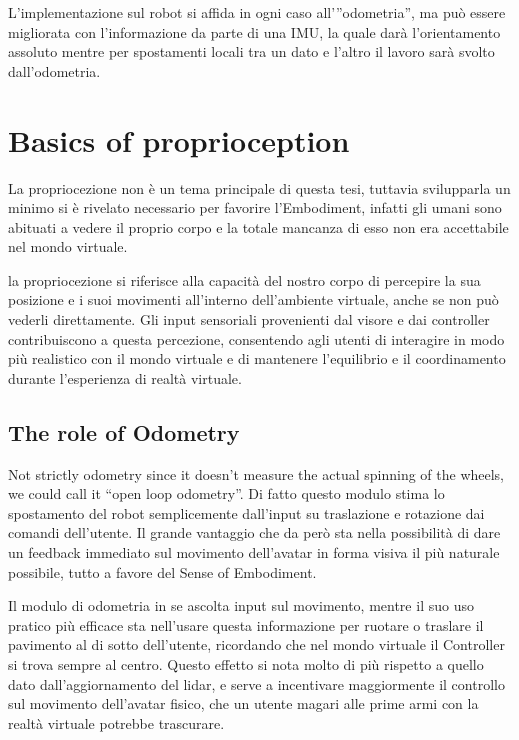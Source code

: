\documentclass{Configuration_Files/PoliMi3i_thesis}
\begin{document}
L’implementazione sul robot si affida in ogni caso all’”odometria”, ma può essere migliorata con l’informazione da parte di una IMU, la quale darà l’orientamento assoluto mentre per spostamenti locali tra un dato e l’altro il lavoro sarà svolto dall’odometria.

\section{Basics of proprioception}

La propriocezione non è un tema principale di questa tesi, tuttavia svilupparla un minimo si è rivelato necessario per favorire l’Embodiment, infatti gli umani sono abituati a vedere il proprio corpo e la totale mancanza di esso non era accettabile nel mondo virtuale.

la propriocezione si riferisce alla capacità del nostro corpo di percepire la sua posizione e i suoi movimenti all'interno dell'ambiente virtuale, anche se non può vederli direttamente. Gli input sensoriali provenienti dal visore e dai controller contribuiscono a questa percezione, consentendo agli utenti di interagire in modo più realistico con il mondo virtuale e di mantenere l'equilibrio e il coordinamento durante l'esperienza di realtà virtuale.

\subsection{The role of Odometry}

Not strictly odometry since it doesn’t measure the actual spinning of the wheels, we could call it “open loop odometry”. Di fatto questo modulo stima lo spostamento del robot semplicemente dall’input su traslazione e rotazione dai comandi dell’utente. Il grande vantaggio che da però sta nella possibilità di dare un feedback immediato sul movimento dell’avatar in forma visiva il più naturale possibile, tutto a favore del Sense of Embodiment.

Il modulo di odometria in se ascolta input sul movimento, mentre il suo uso pratico più efficace sta nell’usare questa informazione per ruotare o traslare il pavimento al di sotto dell’utente, ricordando che nel mondo virtuale il Controller si trova sempre al centro. Questo effetto si nota molto di più rispetto a quello dato dall’aggiornamento del lidar, e serve a incentivare maggiormente il controllo sul movimento dell’avatar fisico, che un utente magari alle prime armi con la realtà virtuale potrebbe trascurare.
\end{document}
